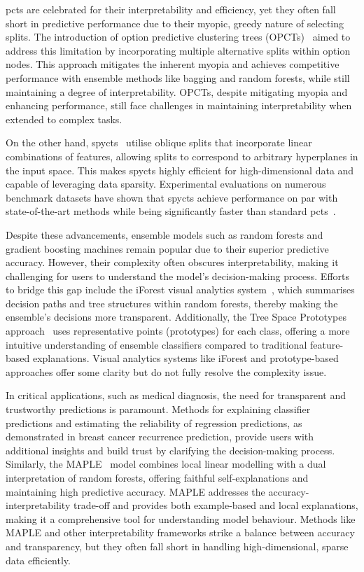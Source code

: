 \documentclass[3p,review,authoryear]{elsarticle}
\begin{document}
\Glspl{pct} are celebrated for their interpretability and efficiency, yet they often fall short in predictive performance due to their myopic, greedy nature of selecting splits.
The introduction of option predictive clustering trees (OPCTs)~\citep{Stepisnik_2020} aimed to address this limitation by incorporating multiple alternative splits within option nodes.
This approach mitigates the inherent myopia and achieves competitive performance with ensemble methods like bagging and random forests, while still maintaining a degree of interpretability.
OPCTs, despite mitigating myopia and enhancing performance, still face challenges in maintaining interpretability when extended to complex tasks.

On the other hand, \glspl{spyct}~\citep{Stepi_nik_2021} utilise oblique splits that incorporate linear combinations of features, allowing splits to correspond to arbitrary hyperplanes in the input space.
This makes \glspl{spyct} highly efficient for high-dimensional data and capable of leveraging data sparsity.
Experimental evaluations on numerous benchmark datasets have shown that \glspl{spyct} achieve performance on par with state-of-the-art methods while being significantly faster than standard \glspl{pct}~\citep{Andonovikj_2024}.

Despite these advancements, ensemble models such as random forests and gradient boosting machines remain popular due to their superior predictive accuracy.
However, their complexity often obscures interpretability, making it challenging for users to understand the model’s decision-making process.
Efforts to bridge this gap include the iForest visual analytics system~\citep{Zhao_2019}, which summarises decision paths and tree structures within random forests, thereby making the ensemble's decisions more transparent.
Additionally, the Tree Space Prototypes approach~\citep{Tan_2020} uses representative points (prototypes) for each class, offering a more intuitive understanding of ensemble classifiers compared to traditional feature-based explanations.
Visual analytics systems like iForest and prototype-based approaches offer some clarity but do not fully resolve the complexity issue.

In critical applications, such as medical diagnosis, the need for transparent and trustworthy predictions is paramount.
Methods for explaining classifier predictions and estimating the reliability of regression predictions, as demonstrated in breast cancer recurrence prediction, provide users with additional insights and build trust by clarifying the decision-making process.
Similarly, the MAPLE~\citep{plumb2018model} model combines local linear modelling with a dual interpretation of random forests, offering faithful self-explanations and maintaining high predictive accuracy.
MAPLE addresses the accuracy-interpretability trade-off and provides both example-based and local explanations, making it a comprehensive tool for understanding model behaviour.
Methods like MAPLE and other interpretability frameworks strike a balance between accuracy and transparency, but they often fall short in handling high-dimensional, sparse data efficiently.
\end{document}
